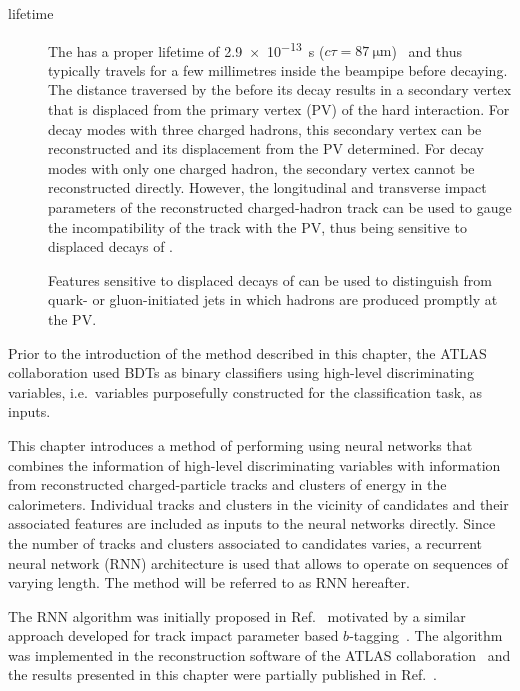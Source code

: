 \begin{description}
\item[\taulepton lifetime] The \taulepton has a proper lifetime of
  \SI{2.9e-13}{\second}
  ($c \tau = \SI{87}{\micro\metre}$)~\cite{pdg2020} and thus typically
  travels for a few millimetres inside the beampipe before
  decaying. The distance traversed by the \taulepton before its decay
  results in a secondary vertex that is displaced from the primary
  vertex (PV) of the hard interaction. For \taulepton decay modes with
  three charged hadrons, this secondary vertex can be reconstructed
  and its displacement from the PV determined. For decay modes with
  only one charged hadron, the secondary vertex cannot be
  reconstructed directly. However, the longitudinal and transverse
  impact parameters of the reconstructed charged-hadron track can be
  used to gauge the incompatibility of the track with the PV, thus
  being sensitive to displaced decays of \tauleptons.

  Features sensitive to displaced decays of \tauleptons can be used to
  distinguish \tauhad from quark- or gluon-initiated jets in which
  hadrons are produced promptly at the PV.

\end{description}
Prior to the introduction of the method described in this chapter, the
ATLAS collaboration used BDTs as binary classifiers using high-level
discriminating variables, i.e.\ variables purposefully constructed for
the classification task, as inputs.

This chapter introduces a method of performing \tauid using neural
networks that combines the information of high-level discriminating
variables with information from reconstructed charged-particle tracks
and clusters of energy in the calorimeters. Individual tracks and
clusters in the vicinity of \tauhadvis candidates and their associated
features are included as inputs to the neural networks directly. Since
the number of tracks and clusters associated to \tauhadvis candidates
varies, a recurrent neural network (RNN) architecture is used that
allows to operate on sequences of varying length. The method will be
referred to as RNN \tauid hereafter.

The RNN \tauid algorithm was initially proposed in
Ref.~\cite{cdeutsch-master} motivated by a similar approach developed
for track impact parameter based
$b$-tagging~\cite{ATL-PHYS-PUB-2017-003}. The algorithm was
implemented in the reconstruction software of the ATLAS
collaboration~\cite{ATL-SOFT-PUB-2021-001} and the results presented
in this chapter were partially published in
Ref.~\cite{ATL-PHYS-PUB-2019-033}. %

